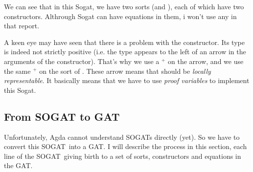 \documentclass[10pt,a4paper]{article}
\begin{document}
			We can see that in this Sogat, we have two sorts (\For and \Pf), each of which have two constructors. Althrough Sogat can have equations in them, i won't use any in that report.
			
			A keen eye may have seen that there is a problem with the \lam constructor. Its type is indeed not strictly positive (i.e. the type \Pf appears to the left of an arrow in the arguments of the constructor). That's why we use a ${}^+$ on the arrow, and we use the same ${}^+$ on the sort of \Pf. These arrow means that \Pf should be \emph{locally representable}. It basically means that we have to use \emph{proof variables} to implement this Sogat.
		
		\subsection{From SOGAT to GAT}
		
			\begin{tcolorbox}
			\end{tcolorbox}
			
			Unfortunately, Agda cannot understand SOGATs directly (yet). So we have to convert this SOGAT into a GAT. I will describe the process in this section, each line of the SOGAT giving birth to a set of sorts, constructors and equations in the GAT.
		
			\begin{tcolorbox}
				\begin{AgdaSuppressSpace}
				\end{AgdaSuppressSpace}
				\vspace{-5.5ex}
			\end{tcolorbox}
		
		
\end{document}
